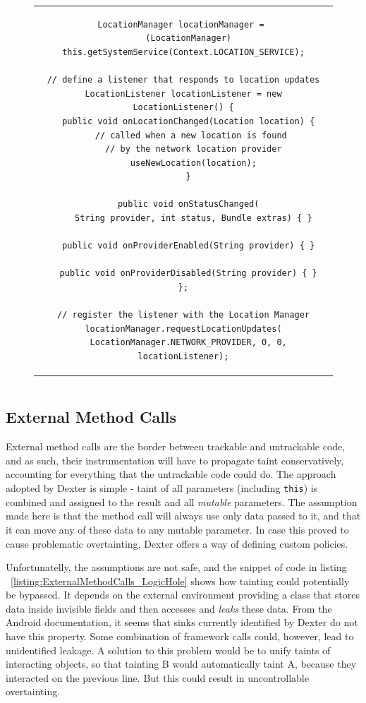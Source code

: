 \documentclass[12pt,twoside,notitlepage]{report}
\begin{document}
\begin{figure}
	\centering
	\begin{tabular}{c}
	\begin{lstlisting}
LocationManager locationManager = 
  (LocationManager) this.getSystemService(Context.LOCATION_SERVICE);

// define a listener that responds to location updates
LocationListener locationListener = new LocationListener() {
  public void onLocationChanged(Location location) {
    // called when a new location is found 
    // by the network location provider
    useNewLocation(location);
  }

  public void onStatusChanged(
    String provider, int status, Bundle extras) { }

  public void onProviderEnabled(String provider) { }

  public void onProviderDisabled(String provider) { }
};

// register the listener with the Location Manager
locationManager.requestLocationUpdates(
  LocationManager.NETWORK_PROVIDER, 0, 0, locationListener);
	\end{lstlisting}
	\end{tabular}
	\begin{lstlisting}[caption={Example of a location-updating callback class},
	                   label={listing:Source_Location_Listener}]
	\end{lstlisting}
\end{figure}

\subsection{External Method Calls}

External method calls are the border between trackable and untrackable code, and as such, their instrumentation will have to propagate taint conservatively, accounting for everything that the untrackable code could do. The approach adopted by Dexter is simple - taint of all parameters (including \verb$this$) is combined and assigned to the result and all \emph{mutable} parameters. The assumption made here is that the method call will always use only data passed to it, and that it can move any of these data to any mutable parameter. In case this proved to cause problematic overtainting, Dexter offers a way of defining custom policies.

Unfortunatelly, the assumptions are not safe, and the snippet of code in listing ~\ref{listing:ExternalMethodCalls_LogicHole} shows how tainting could potentially be bypassed. It depends on the external environment providing a class that stores data inside invisible fields and then accesses and \emph{leaks} these data. From the Android documentation, it seems that sinks currently identified by Dexter do not have this property. Some combination of framework calls could, however, lead to unidentified leakage. A solution to this problem would be to unify taints of interacting objects, so that tainting B would automatically taint A, because they interacted on the previous line. But this could result in uncontrollable overtainting.
\end{document}
